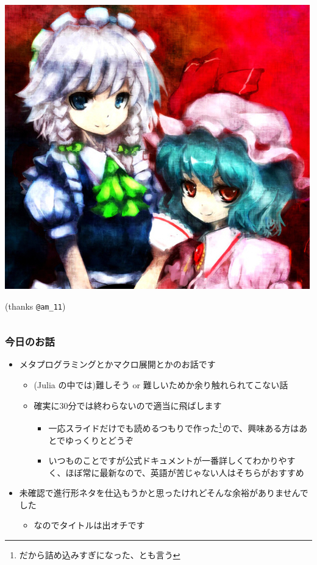 \documentclass[dvipdfmx]{beamer}
\begin{document}
\begin{frame}[containsverbatim]
\begin{columns}
\begin{column}{.3\linewidth}
  \includegraphics[width=\linewidth]{sakuremi.jpg}

  (thanks \verb|@am_11|)
\end{column}
  \end{columns}
\end{frame}

\begin{frame}
  \frametitle{今日のお話}
  \tableofcontents
  \begin{itemize}
    \item メタプログラミングとかマクロ展開とかのお話です
      \begin{itemize}
        \item (Julia の中では)難しそう or 難しいためか余り触れられてこない話
        \item 確実に30分では終わらないので適当に飛ばします
          \begin{itemize}
            \item 一応スライドだけでも読めるつもりで作った\footnote{だから詰め込みすぎになった、とも言う}ので、興味ある方はあとでゆっくりとどうぞ
            \item いつものことですが公式ドキュメントが一番詳しくてわかりやすく、ほぼ常に最新なので、英語が苦じゃない人はそちらがおすすめ
          \end{itemize}
      \end{itemize}
    \item 未確認で進行形ネタを仕込もうかと思ったけれどそんな余裕がありませんでした
      \begin{itemize}
        \item なのでタイトルは出オチです
      \end{itemize}
  \end{itemize}
\end{frame}




\end{document}
